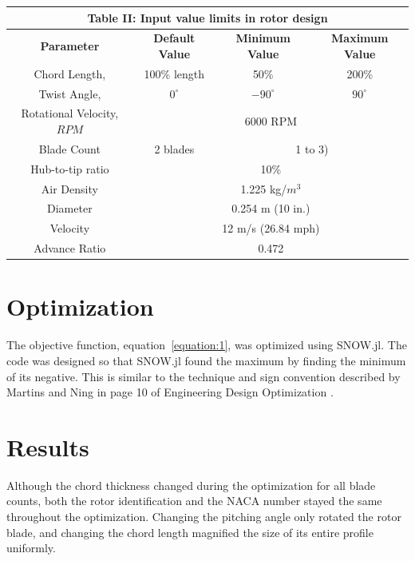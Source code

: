 \documentclass[journal ]{new-aiaa}
\begin{document}
\begin{center}
\begin{tabular}{| c | c | c | c |}
	\multicolumn{4}{c}{Table II: Input value limits in rotor design} \\ \hline
  	 \textbf{Parameter} & \textbf{Default Value} & \textbf{Minimum Value} & \textbf{Maximum Value} \\ \hline
	 Chord Length, & 100\% length & 50\% & 200\% \\ \hline
	 Twist Angle, & $0^{\circ}$ & $-90^{\circ}$ & $90^{\circ}$ \\ \hline \hline
	 Rotational Velocity, $RPM$ & \multicolumn{3}{c|}{6000 RPM} \\ \hline
	 Blade Count & 2 blades & \multicolumn{2}{c|}{1 to 3)}\\ \hline
	 Hub-to-tip ratio & \multicolumn{3}{c|}{10\%} \\ \hline
	 Air Density & \multicolumn{3}{c|}{1.225 kg/$m^{3}$} \\ \hline
	 Diameter & \multicolumn{3}{c|}{0.254 m (10 in.)} \\ \hline
	 Velocity & \multicolumn{3}{c|}{12 m/s (26.84 mph)} \\ \hline
	 Advance Ratio & \multicolumn{3}{c|}{0.472} \\ \hline
\end{tabular}
\label{tab:4}
\end{center}

\section{Optimization}

The objective function, equation~\eqref{equation:1}, was optimized using SNOW.jl. The code was designed so that SNOW.jl found the maximum by finding the minimum of its negative. This is similar to the technique and sign convention described by Martins and Ning in page 10 of Engineering Design Optimization \cite{EngDesOpt}.


\section{Results}

Although the chord thickness changed during the optimization for all blade counts, both the rotor identification and the NACA number stayed the same throughout the optimization. Changing the pitching angle only rotated the rotor blade, and changing the chord length magnified the size of its entire profile uniformly.
\end{document}
